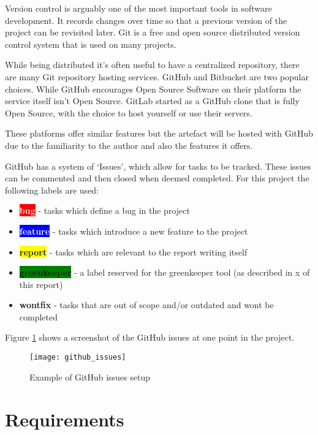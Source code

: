 Version control is arguably one of the most important tools in software development. It records changes over time so that a previous version of the project can be revisited later. Git is a free and open source distributed version control system that is used on many projects. \cite{git}

While being distributed it's often useful to have a centralized repository, there are many Git repository hosting services. GitHub and Bitbucket are two popular choices. While GitHub encourages Open Source Software on their platform the service itself isn't Open Source. \cite{github} GitLab started as a GitHub clone that is fully Open Source, with the choice to host yourself or use their servers. \cite{gitlab} \cite{bitbucket}

These platforms offer similar features but the artefact will be hosted with GitHub due to the familiarity to the author and also the features it offers.

GitHub has a system of `Issues', which allow for tasks to be tracked. These issues can be commented and then closed when deemed completed. For this project the following labels are used:

\begin{itemize}
  \item \textbf{\colorbox{red}{\textcolor{white}{bug}}} - tasks which define a bug in the project
  \item \textbf{\colorbox{blue}{\textcolor{white}{feature}}} -  tasks which introduce a new feature to the project
  \item \textbf{\colorbox{yellow}{report}} - tasks which are relevant to the report writing itself
  \item \textbf{\colorbox{green}{greenkeeper}} - a label reserved for the greenkeeper tool (as described in x of this report)
  \item \textbf{wontfix} - tasks that are out of scope and/or outdated and wont be completed
\end{itemize}

Figure \ref{figure-github-issues} shows a screenshot of the GitHub issues at one point in the project.

\begin{figure}[H]
  \centering
    \texttt{[image: github\_issues]}
  \caption{Example of GitHub issues setup}
  \label{figure-github-issues}
\end{figure}

\section{Requirements} \label{a-d--requirements}

